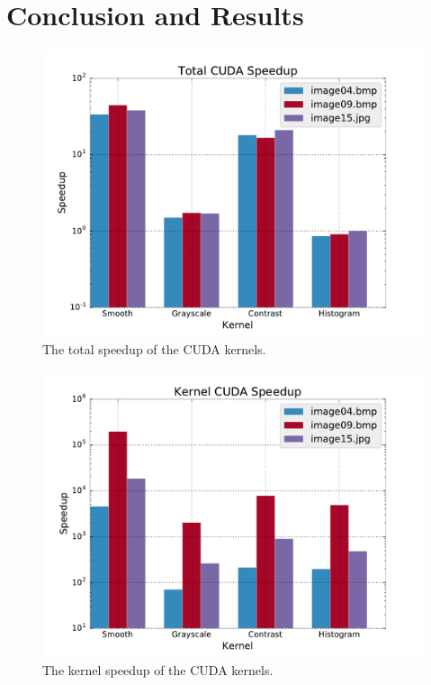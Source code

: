 \documentclass[final]{report}
\begin{document}
\chapter{Conclusion and Results}

\begin{figure}[H]
\centering
    \includegraphics[width=\linewidth]{resources/total-cuda-speedup.pdf}
    \caption{The total speedup of the CUDA kernels.}
    \label{fig:total-cuda-speedup}
\end{figure}

\begin{figure}[H]
\centering
    \includegraphics[width=\linewidth]{resources/kernel-cuda-speedup.pdf}
    \caption{The kernel speedup of the CUDA kernels.}
    \label{fig:kernel-cuda-speedup}
\end{figure}
\end{document}
